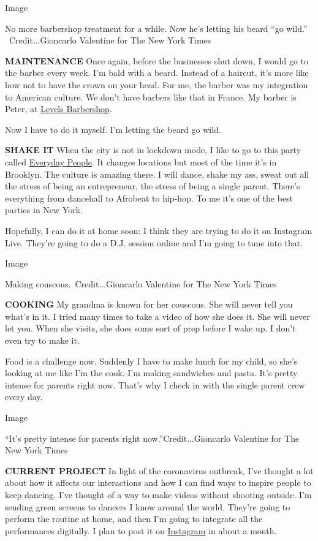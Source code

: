 Image

No more barbershop treatment for a while. Now he's letting his beard
``go wild.''~ ~Credit...Gioncarlo Valentine for The New York Times

\textbf{MAINTENANCE} Once again, before the businesses shut down, I
would go to the barber every week. I'm bald with a beard. Instead of a
haircut, it's more like how not to have the crown on your head. For me,
the barber was my integration to American culture. We don't have barbers
like that in France. My barber is Peter, at
\href{https://www.levelsbarbershop.com/}{Levels Barbershop}.

Now I have to do it myself. I'm letting the beard go wild.

\textbf{SHAKE IT} When the city is not in lockdown mode, I like to go to
this party called \href{https://www.everydayppl.nyc/}{Everyday People}.
It changes locations but most of the time it's in Brooklyn. The culture
is amazing there. I will dance, shake my ass, sweat out all the stress
of being an entrepreneur, the stress of being a single parent. There's
everything from dancehall to Afrobeat to hip-hop. To me it's one of the
best parties in New York.

Hopefully, I can do it at home soon: I think they are trying to do it on
Instagram Live. They're going to do a D.J. session online and I'm going
to tune into that.

Image

Making couscous.~Credit...Gioncarlo Valentine for The New York Times

\textbf{COOKING} My grandma is known for her couscous. She will never
tell you what's in it. I tried many times to take a video of how she
does it. She will never let you. When she visits, she does some sort of
prep before I wake up. I don't even try to make it.

Food is a challenge now. Suddenly I have to make lunch for my child, so
she's looking at me like I'm the cook. I'm making sandwiches and pasta.
It's pretty intense for parents right now. That's why I check in with
the single parent crew every day.

Image

``It's pretty intense for parents right now.''Credit...Gioncarlo
Valentine for The New York Times

\textbf{CURRENT PROJECT} In light of the coronavirus outbreak, I've
thought a lot about how it affects our interactions and how I can find
ways to inspire people to keep dancing. I've thought of a way to make
videos without shooting outside. I'm sending green screens to dancers I
know around the world. They're going to perform the routine at home, and
then I'm going to integrate all the performances digitally. I plan to
post it on
\href{https://www.instagram.com/redisdancing/?hl=en}{Instagram} in about
a month.

